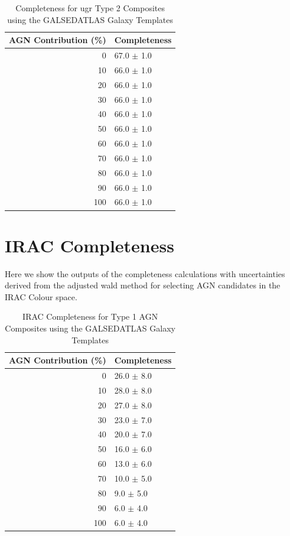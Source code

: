 \begin{appendices}
\begin{table}[h]
\centering
\begin{tabular}{rl}
\hline
AGN Contribution (\%) & Completeness\\
\hline
0 & 67.0 $\pm$ 1.0 \\
10 & 66.0 $\pm$ 1.0 \\
20 & 66.0 $\pm$ 1.0 \\
30 & 66.0 $\pm$ 1.0 \\
40 & 66.0 $\pm$ 1.0 \\
50 & 66.0 $\pm$ 1.0 \\
60 & 66.0 $\pm$ 1.0 \\
70 & 66.0 $\pm$ 1.0 \\
80 & 66.0 $\pm$ 1.0 \\
90 & 66.0 $\pm$ 1.0 \\
100 & 66.0 $\pm$ 1.0 \\
\hline
\end{tabular}
\caption{Completeness for ugr Type 2 Composites using the GALSEDATLAS Galaxy Templates}
\end{table}
\newpage
\section{IRAC Completeness}
Here we show the outputs of the completeness calculations with uncertainties derived from the adjusted wald method for selecting AGN candidates in the IRAC Colour space.
\begin{table}[h]
\centering
\begin{tabular}{rl}
\hline
AGN Contribution (\%) & Completeness \\
\hline
0 & 26.0 $\pm$ 8.0 \\
10 & 28.0 $\pm$ 8.0 \\
20 & 27.0 $\pm$ 8.0 \\
30 & 23.0 $\pm$ 7.0 \\
40 & 20.0 $\pm$ 7.0 \\
50 & 16.0 $\pm$ 6.0 \\
60 & 13.0 $\pm$ 6.0 \\
70 & 10.0 $\pm$ 5.0 \\
80 & 9.0 $\pm$ 5.0 \\
90 & 6.0 $\pm$ 4.0 \\
100 & 6.0 $\pm$ 4.0 \\
\hline
\end{tabular}
\caption{IRAC Completeness for Type 1 AGN Composites using the GALSEDATLAS Galaxy Templates}
\end{table}


\end{appendices}
